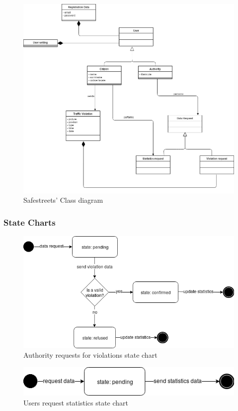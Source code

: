 \documentclass{article}
\begin{document}
\begin{figure}[h!]
    \centering
    \includegraphics[scale=0.3]{img/class_diagram.png}
    \caption{Safestreets' Class diagram}
\end{figure}
\clearpage
\subsubsection{State Charts} 

\begin{figure}[h!]
    \centering
    \includegraphics[scale=0.5]{img/state_charts/authority_request.png}
    \caption{Authority requests for violations state chart}
\end{figure}

\begin{figure}[h!]
    \centering
    \includegraphics[scale=0.5]{img/state_charts/citizen_request.png}
    \caption{Users request statistics state chart}
\end{figure}
\end{document}
